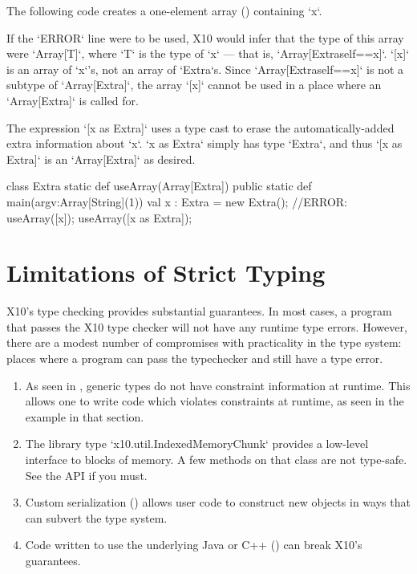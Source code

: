 \begin{ex}
The following code creates a one-element array ()
containing \xcd`x`.  

If  the \xcd`ERROR` line were to be used, 
X10 would infer that the type of this array were \xcd`Array[T]`,
where \xcd`T` is the type of \xcd`x` --- that is, 
\xcd`Array[Extra{self==x}]`.  \xcd`[x]` is an array of \xcd`x`'s, not an array
of \xcd`Extra`s.  Since \xcd`Array[Extra{self==x}]` is not a subtype of 
\xcd`Array[Extra]`, the array \xcd`[x]` cannot be used in a place where an 
\xcd`Array[Extra]` is called for.

The expression \xcd`[x as Extra]` uses a type cast to erase the
automatically-added extra information about \xcd`x`.  \xcd`x as Extra` simply
has type \xcd`Extra`, and thus \xcd`[x as Extra]` is an \xcd`Array[Extra]` as
desired. 


\begin{xten}
class Extra {
  static def useArray(Array[Extra]) {} 
  public static def main(argv:Array[String](1)) {
     val x : Extra = new Extra();
     //ERROR: useArray([x]);
     useArray([x as Extra]);
  }
}
\end{xten}
%


\end{ex}

\section{Limitations of Strict Typing}

X10's type checking provides substantial guarantees.  In most cases, a program
that passes the X10 type checker will not have any runtime type errors.
However, there are a modest number of compromises with practicality in the
type system: places where a program can pass the typechecker and still have a
type error.

\begin{enumerate}

\item As seen in , generic types do not have
      constraint information at runtime.  This allows one to write code which
      violates constraints at runtime, as seen in the example in that section. 


\item The library type \xcd`x10.util.IndexedMemoryChunk` provides a low-level interface
      to blocks of memory.  A few methods on that class are not type-safe. See
      the API if you must.

\item Custom serialization () allows user code to
      construct new objects in ways that can subvert the type system.

\item Code written to use the underlying Java or C++ () can
      break X10's guarantees.

\end{enumerate}
